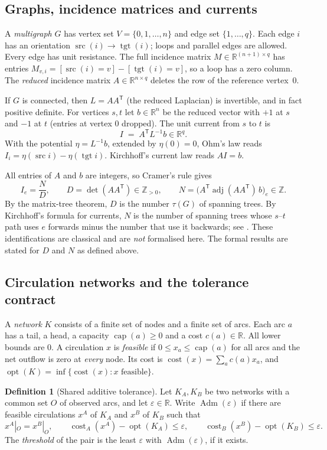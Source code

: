 \documentclass[11pt]{amsart}
\theoremstyle{plain}
\theoremstyle{definition}
\newtheorem{definition}{Definition}
\theoremstyle{remark}
\newcommand{\R}{\mathbb{R}}
\newcommand{\Z}{\mathbb{Z}}
\newcommand{\T}{\mathsf{T}}
\newcommand{\src}{\operatorname{src}}
\newcommand{\tgt}{\operatorname{tgt}}
\newcommand{\opt}{\operatorname{opt}}
\newcommand{\cost}{\operatorname{cost}}
\newcommand{\capac}{\operatorname{cap}}
\newcommand{\Adm}{\operatorname{Adm}}
\begin{document}
\subsection{Graphs, incidence matrices and currents}
A \emph{multigraph} $G$ has vertex set $V=\{0,1,\dots,n\}$ and edge set $\{1,\dots,q\}$. Each edge $i$ has an
orientation $\src(i)\to\tgt(i)$; loops and parallel edges are allowed. Every edge has unit resistance. The full
incidence matrix $M\in\R^{(n+1)\times q}$ has entries $M_{v,i}=[\src(i)=v]-[\tgt(i)=v]$, so a loop has a zero
column. The \emph{reduced} incidence matrix $A\in\R^{n\times q}$ deletes the row of the reference vertex~$0$.

If $G$ is connected, then $L=AA^{\T}$ (the reduced Laplacian) is invertible, and in fact positive definite. For
vertices $s,t$ let $b\in\R^n$ be the reduced vector with $+1$ at $s$ and $-1$ at $t$ (entries at vertex $0$
dropped). The unit current from $s$ to $t$ is
\[
I \;=\; A^{\T}L^{-1}b\in\R^q .
\]
With the potential $\eta=L^{-1}b$, extended by $\eta(0)=0$, Ohm's law reads $I_i=\eta(\src i)-\eta(\tgt i)$.
Kirchhoff's current law reads $AI=b$.

All entries of $A$ and $b$ are integers, so Cramer's rule gives
\[
I_e=\frac{N}{D},\qquad D=\det(AA^{\T})\in\Z_{>0},\qquad N=\bigl(A^{\T}\operatorname{adj}(AA^{\T})\,b\bigr)_e\in\Z .
\]
By the matrix-tree theorem, $D$ is the number $\tau(G)$ of spanning trees. By Kirchhoff's formula for currents,
$N$ is the number of spanning trees whose $s$--$t$ path uses $e$ forwards minus the number that use it backwards;
see \cite{Kirchhoff1847,DoyleSnell,LyonsPeres,Bollobas}. These identifications are classical and are \emph{not}
formalised here. The formal results are stated for $D$ and $N$ as defined above.

\subsection{Circulation networks and the tolerance contract}
A \emph{network} $K$ consists of a finite set of nodes and a finite set of arcs. Each arc $a$ has a tail, a head,
a capacity $\capac(a)\ge 0$ and a cost $c(a)\in\R$. All lower bounds are $0$. A circulation $x$ is \emph{feasible} if
$0\le x_a\le\capac(a)$ for all arcs and the net outflow is zero at \emph{every} node. Its cost is
$\cost(x)=\sum_a c(a)x_a$, and $\opt(K)=\inf\{\cost(x): x\text{ feasible}\}$.

\begin{definition}[Shared additive tolerance]\label{def:adm}
Let $K_A,K_B$ be two networks with a common set $O$ of observed arcs, and let $\varepsilon\in\R$. Write
$\Adm(\varepsilon)$ if there are feasible circulations $x^A$ of $K_A$ and $x^B$ of $K_B$ such that
\[
x^A|_O=x^B|_O,\qquad \cost_A(x^A)-\opt(K_A)\le\varepsilon,\qquad \cost_B(x^B)-\opt(K_B)\le\varepsilon .
\]
The \emph{threshold} of the pair is the least $\varepsilon$ with $\Adm(\varepsilon)$, if it exists.
\end{definition}
\end{document}
